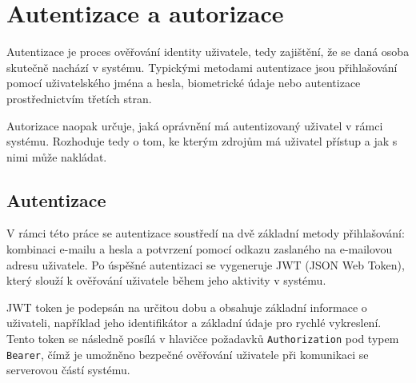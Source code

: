     


\section{Autentizace a autorizace}\label{text:navrh/auth}

Autentizace je proces ověřování identity uživatele, tedy zajištění, že se daná osoba skutečně nachází v systému. 
Typickými metodami autentizace jsou přihlašování pomocí uživatelského jména a hesla, biometrické údaje nebo autentizace prostřednictvím třetích stran.

Autorizace naopak určuje, jaká oprávnění má autentizovaný uživatel v rámci systému.
Rozhoduje tedy o tom, ke kterým zdrojům má uživatel přístup a jak s nimi může nakládat.

\subsection{Autentizace}

V rámci této práce se autentizace soustředí na dvě základní metody přihlašování: kombinaci e-mailu a hesla a potvrzení pomocí odkazu zaslaného na e-mailovou adresu uživatele. 
Po úspěšné autentizaci se vygeneruje JWT (JSON Web Token), který slouží k ověřování uživatele během jeho aktivity v systému.

JWT token je podepsán na určitou dobu a obsahuje základní informace o uživateli, například jeho identifikátor a základní údaje pro rychlé vykreslení. 
Tento token se následně posílá v hlavičce požadavků \texttt{Authorization} pod typem \texttt{Bearer}, čímž je umožněno bezpečné ověřování uživatele při komunikaci se serverovou částí systému.

